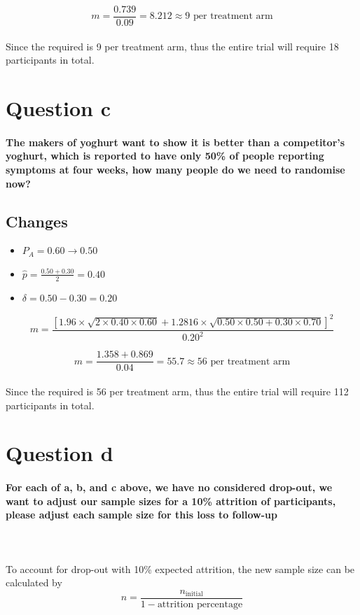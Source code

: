 \documentclass{article}
\begin{document}
\begin{equation*}
    m = \dfrac{0.739}{0.09} = 8.212 \approx 9 \text{ per treatment arm}
\end{equation*}
\\
Since the required is 9 per treatment arm, thus the entire trial will require 18 participants in total.

\section*{Question c}
\paragraph{The makers of yoghurt want to show it is better than a competitor’s yoghurt, which is reported to have only 50\%
of people reporting symptoms at four weeks, how many people do we need to randomise now?}

\subsection*{Changes}
\begin{itemize}
    \item $P_A = 0.60 \rightarrow 0.50$
    \item $\hat{p} = \frac{0.50 + 0.30}{2} = 0.40$
    \item $\delta = 0.50 - 0.30 = 0.20$
\end{itemize}

\begin{equation*}
    m = \dfrac{[1.96 \times \sqrt{2 \times 0.40 \times 0.60} + 1.2816 \times \sqrt{0.50 \times 0.50 + 0.30 \times 0.70} ]^2}{0.20^2}
\end{equation*}

\begin{equation*}
    m = \dfrac{1.358 + 0.869}{0.04} = 55.7 \approx 56 \text{ per treatment arm}
\end{equation*}
\\
Since the required is 56 per treatment arm, thus the entire trial will require 112 participants in total.


\section*{Question d}
\paragraph{For each of a, b, and c above, we have no considered drop-out, we want to adjust our sample sizes for a 10\%
attrition of participants, please adjust each sample size for this loss to follow-up}\mbox{}\\
\\
To account for drop-out with 10\% expected attrition, the new sample size can be calculated by
\begin{equation*}
    n = \frac{n_{\text{initial}}}{1 - \text{attrition percentage}}
\end{equation*}
\end{document}
